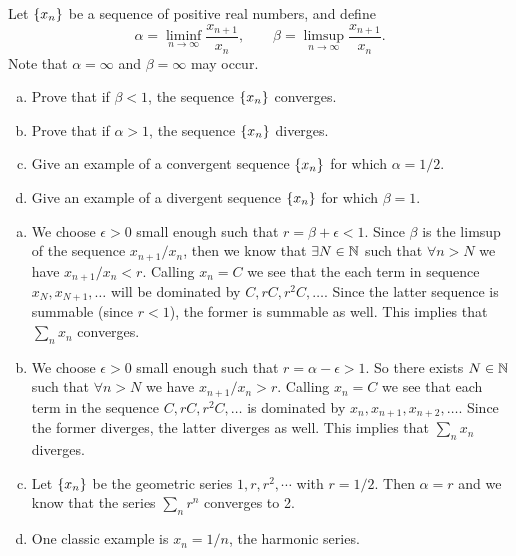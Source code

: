 \begin{problem}
	Let $ \{x_n\} $ be a sequence of positive real numbers, and define
	\[ \alpha = \liminf_{n\to\infty}\frac{x_{n+1}}{x_n},\qquad \beta = \limsup_{n\to\infty}\frac{x_{n+1}}{x_n}. \]
	Note that $ \alpha = \infty $ and $ \beta = \infty $ may occur.
	\begin{enumerate}[(a)]
		\item Prove that if $ \beta < 1 $, the sequence $ \{x_n\} $ converges. 
		\item Prove that if $ \alpha > 1 $, the sequence $ \{x_n\} $ diverges. 
		\item Give an example of a  convergent sequence $ \{x_n\} $ for which $ \alpha = 1/2 $.
		\item Give an example of a divergent sequence $ \{x_n\} $ for which $ \beta = 1 $.
	\end{enumerate}
\end{problem}
\begin{solution}
	\begin{enumerate}[(a)]
		\item We choose $ \epsilon>0 $ small enough such that $ r = \beta + \epsilon < 1 $. Since $ \beta $ is the limsup of the sequence $ x_{n+1}/x_n $, then we know that $ \exists N \in \mathbb{N} $ such that $ \forall n > N $ we have $ x_{n+1}/x_n < r $. Calling $ x_{n} = C $ we see that the each term in sequence $ x_{N}, x_{N+1},\dots $ will be dominated by $ C, rC, r^2C,\dots $. Since the latter sequence is summable (since $ r<1 $), the former is summable as well. This implies that $ \sum_n x_n $ converges. 
		
		\item We choose $ \epsilon>0 $ small enough such that $ r = \alpha - \epsilon > 1 $. So there exists $ N\in \mathbb{N} $ such that $ \forall n > N $ we have $ x_{n+1}/x_n > r $. Calling $ x_n = C $ we see that each term in the sequence $ C, rC, r^2C, \dots $ is dominated by $ x_{n},x_{n+1},x_{n+2},\dots $.  Since the former diverges, the latter diverges as well. This implies that $ \sum_n x_n $ diverges. 
		
		\item Let $ \{x_n\} $ be the geometric series $ 1,r,r^2,\cdots $ with $ r = 1/2 $. Then $ \alpha = r $ and we know that the series $ \sum_n r^n  $ converges to 2.
		
		\item One classic example is $ x_n = 1/n $, the harmonic series. 
	\end{enumerate}
\end{solution}


